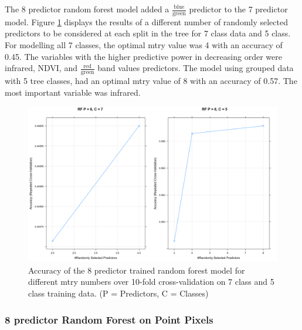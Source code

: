 \documentclass[12pt,twoside]{reedthesis}
\begin{document}
The 8 predictor random forest model added a \(\frac{\mbox{blue}}{\mbox{green}}\) predictor to the 7 predictor model. Figure \ref{fig:rf8} displays the results of a different number of randomly selected predictors to be considered at each split in the tree for 7 class data and 5 class. For modelling all 7 classes, the optimal mtry value was 4 with an accuracy of 0.45. The variables with the higher predictive power in decreasing order were infrared, NDVI, and \(\frac{\mbox{red}}{\mbox{green}}\) band values predictors. The model using grouped data with 5 tree classes, had an optimal mtry value of 8 with an accuracy of 0.57. The most important variable was infrared.
\begin{figure}

{\centering \includegraphics[width=0.9\linewidth]{figure/rf8_mtry} 

}

\caption{Accuracy of the 8 predictor trained random forest model for different mtry numbers over 10-fold cross-validation on 7 class and 5 class training data. (P = Predictors, C = Classes)}\label{fig:rf8}
\end{figure}
\hypertarget{predictor-random-forest-on-point-pixels}{%
\subsubsection{8 predictor Random Forest on Point Pixels}\label{predictor-random-forest-on-point-pixels}}
\end{document}
